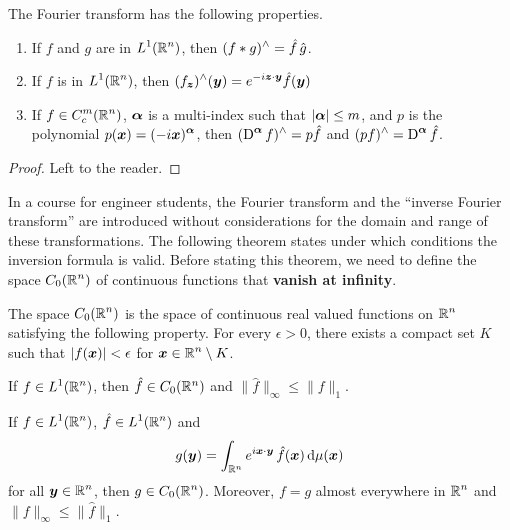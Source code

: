 
The Fourier transform has the following properties.

\begin{prop} \label{FTLofPs}
\begin{enumerate}
\item If $f$ and $g$ are in $\displaystyle L^1(\mathbb{R}^n)$, then
$\displaystyle (f\ast g)^\wedge = \hat{f}\,\hat{g}$.
\item If $f$ is in $\displaystyle L^1(\mathbb{R}^n)$, then
$\displaystyle (f_{{\bm{z}}})^\wedge({\bm{y}}) =
e^{-i {\bm{z}}\cdot{\bm{y}}} \hat{f}({\bm{y}})$
\item If $\displaystyle f \in C_c^m(\mathbb{R}^n)$, ${\bm{\alpha}}$ is a multi-index
such that $|{\bm{\alpha}}|\leq m$, and $p$ is the polynomial
$\displaystyle p({\bm{x}}) = (-i{\bm{x}})^{{\bm{\alpha}}}$,
then $\displaystyle (\operatorname{D}^{{\bm{\alpha}}} f)^\wedge = p \hat{f}$ and
$\displaystyle (p f)^\wedge = \operatorname{D}^{{\bm{\alpha}}}\hat{f}$.
\end{enumerate}
\end{prop}

\begin{proof}
Left to the reader.
\end{proof}

In a course for engineer students, the Fourier transform and the
``inverse Fourier transform'' are introduced without considerations
for the domain and range of these transformations.  The following
theorem states under which conditions the inversion formula is valid.
Before stating this theorem, we need to define the space
$\displaystyle C_0(\mathbb{R}^n)$ of continuous functions that
{\bfseries vanish at infinity}.

The space $\displaystyle C_0(\mathbb{R}^n)$ is the space of continuous real valued
functions on $\displaystyle \mathbb{R}^n$ satisfying the following property.  For every
$\epsilon >0$, there exists a compact set $K$ such that
$|f({\bm{x}})|<\epsilon$ for $\displaystyle {\bm{x}} \in \mathbb{R}^n \setminus K$.

\begin{prop} \label{distr_C0_four_transf}
If $\displaystyle f\in L^1(\mathbb{R}^n)$, then $\hat{f} \in C_0(\mathbb{R}^n)$ and
$\|\hat{f}\|_\infty \leq \|f\|_1$.
\end{prop}

\begin{prop} \label{distr_inv_four_transf}
If $\displaystyle f \in L^1(\mathbb{R}^n)$, $\displaystyle \hat{f} \in L^1(\mathbb{R}^n)$ and
\[
g({\bm{y}}) = \int_{\mathbb{R}^n} e^{i {\bm{x}}\cdot{\bm{y}}} \,
\hat{f}({\bm{x}}) \,\mathrm{d}{\mu({\bm{x}})}
\]
for all $\displaystyle {\bm{y}} \in \mathbb{R}^n$, then
$\displaystyle g \in C_0(\mathbb{R}^n)$.  Moreover, $f = g$ almost everywhere
in $\displaystyle \mathbb{R}^n$ and $\|f\|_\infty \leq \|\hat{f}\|_1$.
\end{prop}


